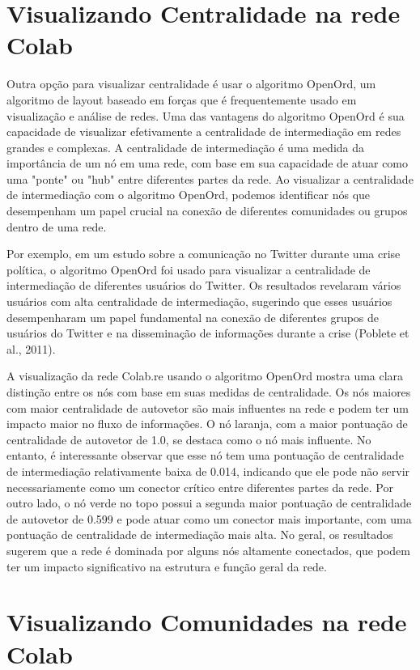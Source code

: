 \section{Visualizando Centralidade na rede Colab}

Outra opção para visualizar centralidade é usar o algoritmo OpenOrd, um algoritmo de layout baseado em forças que é frequentemente usado em visualização e análise de redes. Uma das vantagens do algoritmo OpenOrd é sua capacidade de visualizar efetivamente a centralidade de intermediação em redes grandes e complexas. A centralidade de intermediação é uma medida da importância de um nó em uma rede, com base em sua capacidade de atuar como uma "ponte" ou "hub" entre diferentes partes da rede. Ao visualizar a centralidade de intermediação com o algoritmo OpenOrd, podemos identificar nós que desempenham um papel crucial na conexão de diferentes comunidades ou grupos dentro de uma rede.

Por exemplo, em um estudo sobre a comunicação no Twitter durante uma crise política, o algoritmo OpenOrd foi usado para visualizar a centralidade de intermediação de diferentes usuários do Twitter. Os resultados revelaram vários usuários com alta centralidade de intermediação, sugerindo que esses usuários desempenharam um papel fundamental na conexão de diferentes grupos de usuários do Twitter e na disseminação de informações durante a crise (Poblete et al., 2011).

A visualização da rede Colab.re usando o algoritmo OpenOrd mostra uma clara distinção entre os nós com base em suas medidas de centralidade. Os nós maiores com maior centralidade de autovetor são mais influentes na rede e podem ter um impacto maior no fluxo de informações. O nó laranja, com a maior pontuação de centralidade de autovetor de 1.0, se destaca como o nó mais influente. No entanto, é interessante observar que esse nó tem uma pontuação de centralidade de intermediação relativamente baixa de 0.014, indicando que ele pode não servir necessariamente como um conector crítico entre diferentes partes da rede. Por outro lado, o nó verde no topo possui a segunda maior pontuação de centralidade de autovetor de 0.599 e pode atuar como um conector mais importante, com uma pontuação de centralidade de intermediação mais alta. No geral, os resultados sugerem que a rede é dominada por alguns nós altamente conectados, que podem ter um impacto significativo na estrutura e função geral da rede.

\section{Visualizando Comunidades na rede Colab}

